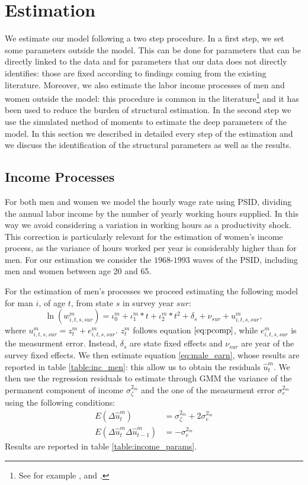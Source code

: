 \documentclass[12pt]{article}
\numberwithin{table}{section}
\begin{document}
\section{Estimation}
We estimate our model following a two step procedure. In a first step, we set some parameters outside the model. This can be done for parameters that can be directly linked to the data and for parameters that our data does not directly identifies: those are fixed according to findings coming from the existing literature. Moreover, we also estimate the labor income processes of men and women outside the model: this procedure is common in the literature\footnote{See for example \cite{voena2015}, \cite{reynoso2019} and \cite{gourinchas2002}.} and it has been used to reduce the burden of structural estimation.
 In the second step we use the simulated method of moments to estimate the deep parameters of the model. In this section we described in detailed every step of the estimation and we discuss the identification of the structural parameters as well as the results.
\subsection{Income Processes}
For both men and women we model the hourly wage rate using PSID, dividing the annual labor income by the number of yearly working hours supplied. In this way we avoid considering a variation in working hours as a productivity shock. This correction is particularly relevant for the estimation of women's income process, as the variance of hours worked per year is considerably higher than for men. For our estimation we consider the $1968$-$1993$ waves of the PSID, including men and women between age 20 and 65.

For the estimation of men's processes we proceed estimating the following model for man $i$, of age $t$, from state $s$  in survey year $sur$:
\begin{equation}\label{eq:male_earn}
\ln(w^m_{i,t,s,sur})=\iota^m_0+\iota^m_1*t+\iota^m_2*t^2+\delta_s+\nu_{sur}+u_{i,t,s,sur}^m,
\end{equation}
where $u_{i,t,s,sur}^m=z_t^m+e^m_{i,t,s,sur}$. $z_t^m$ follows equation $\ref{eq:pcomp}$, while $e^m_{i,t,s,sur}$ is the measurment error. Instead, $\delta_s$ are state fixed effects and $\nu_{sur}$ are year of the survey fixed effects. We then estimate equation \ref{eq:male_earn}, whose results are reported in table \ref{table:inc_men}: this allow us to obtain the residuals  $\hat{u}_{t}^m$. We then use the regression residuals to estimate through GMM the variance of the permanent component of income $\sigma_\zeta^{2_m}$ and the one of the measurment error $\sigma_e^{2_m}$ using the following conditions:
\begin{equation}\label{eq:male_gmm}
\begin{split}
E(\Delta\hat{u}_{t}^m)&=\sigma_\zeta^{2_m}+2\sigma_e^{2_m}\\
E(\Delta\hat{u}_{t}^m\Delta\hat{u}_{t-1}^m)&=-\sigma_e^{2_m}
\end{split}
\end{equation}
Results are reported in table \ref{table:income_params}.
\end{document}
